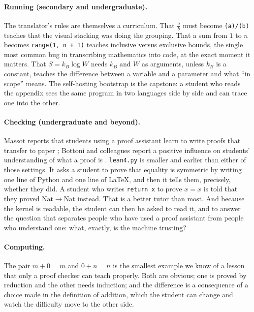 \documentclass[11pt]{article}
\begin{document}
\paragraph{Running (secondary and undergraduate).} The translator's rules are
themselves a curriculum. That $\frac{a}{b}$ must become \verb|(a)/(b)| teaches
that the visual stacking was doing the grouping. That a sum from $1$ to $n$
becomes \verb|range(1, n + 1)| teaches inclusive versus exclusive bounds, the
single most common bug in transcribing mathematics into code, at the exact
moment it matters. That $S = k_B\log W$ needs $k_B$ and $W$ as arguments, unless
$k_B$ is a constant, teaches the difference between a variable and a parameter
and what ``in scope'' means. The self-hosting bootstrap is the capstone: a
student who reads the appendix sees the same program in two languages side by
side and can trace one into the other.

\paragraph{Checking (undergraduate and beyond).} Massot reports that students
using a proof assistant learn to write proofs that transfer to paper
\cite{massot2024}; Bottoni and colleagues report a positive influence on
students' understanding of what a proof is \cite{bottoni2025}. \texttt{lean4.py}
is smaller and earlier than either of those settings. It asks a student to
prove that equality is symmetric by writing one line of Python and one line of
\LaTeX{}, and then it tells them, precisely, whether they did. A student who
writes \verb|return x| to prove $x = x$ is told that they proved
$\mathrm{Nat}\to\mathrm{Nat}$ instead. That is a better tutor than most. And
because the kernel is readable, the student can then be asked to read it, and
to answer the question that separates people who have used a proof assistant
from people who understand one: what, exactly, is the machine trusting?

\paragraph{Computing.} The pair $m + 0 = m$ and $0 + n = n$ is the smallest
example we know of a lesson that only a proof checker can teach properly. Both
are obvious; one is proved by reduction and the other needs induction; and the
difference is a consequence of a choice made in the definition of addition,
which the student can change and watch the difficulty move to the other side.
\end{document}
